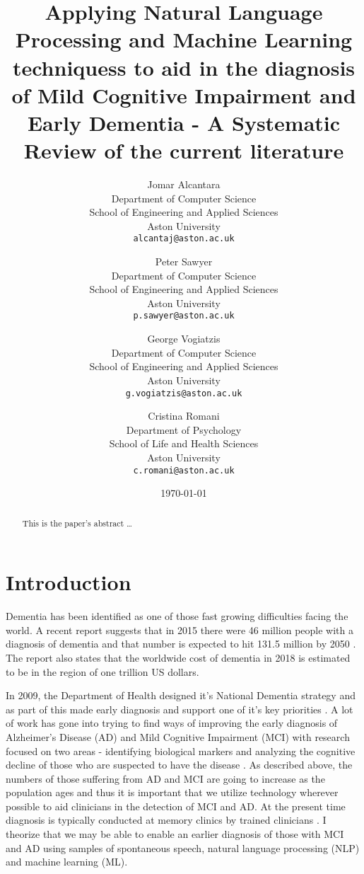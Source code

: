 \documentclass[12pt]{article}
\title{Applying Natural Language Processing and Machine Learning techniquess to aid in the diagnosis of Mild Cognitive Impairment and Early Dementia - A Systematic Review of the current literature}
\author{
	Jomar Alcantara \\
	Department of Computer Science\\
	School of Engineering and Applied Sciences\\
	Aston University\\
	\texttt{alcantaj@aston.ac.uk} \\
		\and
	Peter Sawyer \\
	Department of Computer Science\\
	School of Engineering and Applied Sciences\\
	Aston University\\
	\texttt{p.sawyer@aston.ac.uk}
		\and
	George Vogiatzis\\
	Department of Computer Science\\
	School of Engineering and Applied Sciences\\
	Aston University \\
	\texttt{g.vogiatzis@aston.ac.uk} \\
		\and
	Cristina Romani\\
	Department of Psychology\\
	School of Life and Health Sciences\\
	Aston University \\
	\texttt{c.romani@aston.ac.uk}
}
\date{\today}
\begin{document}
\maketitle

\bigskip
\begin{abstract}
This is the paper's abstract \ldots
\end{abstract}

\section{Introduction}
Dementia has been identified as one of those fast growing difficulties facing the world. A recent report suggests that in 2015 there were 46 million people with a diagnosis of dementia and that number is expected to hit 131.5 million by 2050 \cite{Prince2015}. The report also states that the worldwide cost of dementia in 2018 is estimated to be in the region of one trillion US dollars.
\par
In 2009, the Department of Health designed it's National Dementia strategy and as part of this made early diagnosis and support one of it's key priorities \cite{England2009}. A lot of work has gone into trying to find ways of improving the early diagnosis of Alzheimer's Disease (AD) and Mild Cognitive Impairment (MCI) with research focused on two areas - identifying biological markers and analyzing the cognitive decline of those who are suspected to have the disease \cite{Taler2008}. As described above, the numbers of those suffering from AD and MCI are going to increase as the population ages \cite{Prince2015} and thus it is important that we utilize technology wherever possible to aid clinicians in the detection of MCI and AD. At the present time diagnosis is typically conducted at memory clinics by trained clinicians \cite{Boschi2017}. I theorize that we may be able to enable an earlier diagnosis of those with MCI and AD using samples of spontaneous speech, natural language processing (NLP) and machine learning (ML).
\par
\end{document}
